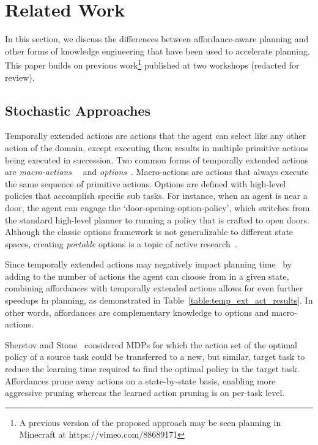 \documentclass[letterpaper]{article}
\begin{document}
\section{Related Work}
\label{sec:related-work}

In this section, we discuss the differences between affordance-aware
planning and other forms of knowledge engineering that have been used
to accelerate planning.  This paper builds on previous work\footnote{A
  previous version of the proposed approach may be seen planning in
  Minecraft at https://vimeo.com/88689171} published at two workshops
(redacted for review).

\subsection{Stochastic Approaches}

Temporally extended actions are actions that the agent can select like
any other action of the domain, except executing them results in
multiple primitive actions being executed in succession. Two common
forms of temporally extended actions are {\em
  macro-actions}~\cite{hauskrecht98} ~and {\em
  options}~\cite{sutton99}.  Macro-actions are actions that always
execute the same sequence of primitive actions. Options are defined
with high-level policies that accomplish specific sub tasks. For
instance, when an agent is near a door, the agent can engage the
`door-opening-option-policy', which switches from the standard
high-level planner to running a policy that is crafted to open doors.
Although the classic options framework is not generalizable to
different state spaces, creating {\em portable} options is a topic of
active
research~\cite{konidaris07,konidaris2009efficient,Ravindran03analgebraic,croonenborghs2008learning,andre2002state,konidaris2012transfer}.

Since temporally extended actions may negatively impact planning
time~\cite{Jong:2008zr} by adding to the number of actions the agent
can choose from in a given state, combining affordances with
temporally extended actions allows for even further speedups in
planning, as demonstrated in Table~\ref{table:temp_ext_act_results}. In
other words, affordances are complementary knowledge to options and
macro-actions.

Sherstov and Stone~\cite{sherstov2005improving} considered MDPs for
which the action set of the optimal policy of a source task could be
transferred to a new, but similar, target task to reduce the learning
time required to find the optimal policy in the target task.
Affordances prune away actions on a state-by-state basis, enabling
more aggressive pruning whereas the learned action pruning is on per-task
level.
\end{document}
